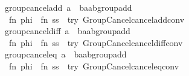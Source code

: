 \begin{isabellebody}
\ group{\isacharunderscore}{\kern0pt}cancel{\isacharunderscore}{\kern0pt}add\ {\isacharparenleft}{\kern0pt}{\isachardoublequoteopen}a\ {\isacharplus}{\kern0pt}\ b{\isacharcolon}{\kern0pt}{\isacharcolon}{\kern0pt}{\isacharprime}{\kern0pt}a{\isacharcolon}{\kern0pt}{\isacharcolon}{\kern0pt}ab{\isacharunderscore}{\kern0pt}group{\isacharunderscore}{\kern0pt}add{\isachardoublequoteclose}{\isacharparenright}{\kern0pt}\ {\isacharequal}{\kern0pt}\isanewline
\ \ {\isacartoucheopen}fn\ phi\ {\isacharequal}{\kern0pt}{\isachargreater}{\kern0pt}\ fn\ ss\ {\isacharequal}{\kern0pt}{\isachargreater}{\kern0pt}\ try\ Group{\isacharunderscore}{\kern0pt}Cancel{\isachardot}{\kern0pt}cancel{\isacharunderscore}{\kern0pt}add{\isacharunderscore}{\kern0pt}conv{\isacartoucheclose}\isanewline
\isanewline
{}\isamarkupfalse%
\ group{\isacharunderscore}{\kern0pt}cancel{\isacharunderscore}{\kern0pt}diff\ {\isacharparenleft}{\kern0pt}{\isachardoublequoteopen}a\ {\isacharminus}{\kern0pt}\ b{\isacharcolon}{\kern0pt}{\isacharcolon}{\kern0pt}{\isacharprime}{\kern0pt}a{\isacharcolon}{\kern0pt}{\isacharcolon}{\kern0pt}ab{\isacharunderscore}{\kern0pt}group{\isacharunderscore}{\kern0pt}add{\isachardoublequoteclose}{\isacharparenright}{\kern0pt}\ {\isacharequal}{\kern0pt}\isanewline
\ \ {\isacartoucheopen}fn\ phi\ {\isacharequal}{\kern0pt}{\isachargreater}{\kern0pt}\ fn\ ss\ {\isacharequal}{\kern0pt}{\isachargreater}{\kern0pt}\ try\ Group{\isacharunderscore}{\kern0pt}Cancel{\isachardot}{\kern0pt}cancel{\isacharunderscore}{\kern0pt}diff{\isacharunderscore}{\kern0pt}conv{\isacartoucheclose}\isanewline
\isanewline
{}\isamarkupfalse%
\ group{\isacharunderscore}{\kern0pt}cancel{\isacharunderscore}{\kern0pt}eq\ {\isacharparenleft}{\kern0pt}{\isachardoublequoteopen}a\ {\isacharequal}{\kern0pt}\ {\isacharparenleft}{\kern0pt}b{\isacharcolon}{\kern0pt}{\isacharcolon}{\kern0pt}{\isacharprime}{\kern0pt}a{\isacharcolon}{\kern0pt}{\isacharcolon}{\kern0pt}ab{\isacharunderscore}{\kern0pt}group{\isacharunderscore}{\kern0pt}add{\isacharparenright}{\kern0pt}{\isachardoublequoteclose}{\isacharparenright}{\kern0pt}\ {\isacharequal}{\kern0pt}\isanewline
\ \ {\isacartoucheopen}fn\ phi\ {\isacharequal}{\kern0pt}{\isachargreater}{\kern0pt}\ fn\ ss\ {\isacharequal}{\kern0pt}{\isachargreater}{\kern0pt}\ try\ Group{\isacharunderscore}{\kern0pt}Cancel{\isachardot}{\kern0pt}cancel{\isacharunderscore}{\kern0pt}eq{\isacharunderscore}{\kern0pt}conv{\isacartoucheclose}\isanewline
\isanewline
{}\isamarkupfalse%

\end{isabellebody}
